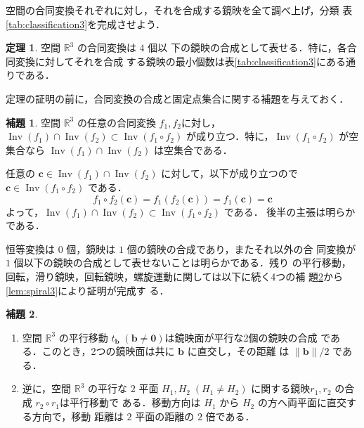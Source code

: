 \documentclass[11pt, uplatex, dvipdfmx, titlepage]{jsarticle}
\makeatletter
\DeclareMathOperator{\Inv}{Inv}
\renewenvironment{proof}[1][\proofname]{\par
  \pushQED{\qed}%
  \normalfont \topsep6\p@\@plus6\p@\relax
  \trivlist
  \item[\hskip\labelsep
         \bfseries
    {#1}]\ignorespaces
}{%
  \popQED\endtrivlist\@endpefalse
}
\theoremstyle{definition}
\newtheorem{theorem}{定理}[section]
\newtheorem{lemma}{補題}[section]
\renewcommand{\proofname}{\textbf{証明}}
\makeatother
\begin{document}
空間の合同変換それぞれに対し，それを合成する鏡映を全て調べ上げ，分類
表\ref{tab:classification3}を完成させよう．

\begin{theorem}\label{thm:generate3}
  空間 $\mathbb{R}^3$ の合同変換は $4$ 個以
  下の鏡映の合成として表せる．特に，各合同変換に対してそれを合成
  する鏡映の最小個数は表\ref{tab:classification3}にある通りである．
\end{theorem}

定理の証明の前に，合同変換の合成と固定点集合に関する補題を与えておく．

\begin{lemma}\label{lem:inv-comp3}
  空間 $\mathbb{R}^3$ の任意の合同変換 $f_1,
  f_2$に対し，$ \Inv(f_1) \cap \Inv(f_2) \subset \Inv(f_1 \circ f_2)$
  が成り立つ．特に，$\Inv(f_1 \circ f_2)$ が空集合なら $\Inv(f_1) \cap
  \Inv(f_2)$ は空集合である．
\end{lemma}

\begin{proof}
  任意の $\bm{c} \in \Inv(f_1) \cap \Inv(f_2)$ に対して，以下が成り立つので $\bm{c} \in \Inv(f_1 \circ f_2)$ である．
  \[
    f_1 \circ f_2(\bm{c}) = f_1\left( f_2(\bm{c})\right) = f_1(\bm{c}) = \bm{c}
  \]
  よって，$\Inv(f_1) \cap \Inv(f_2) \subset \Inv(f_1 \circ f_2)$ である．
  後半の主張は明らかである．
\end{proof}


\begin{proof}[定理\ref{thm:generate3}の証明]
  恒等変換は $0$ 個，鏡映は $1$ 個の鏡映の合成であり，またそれ以外の合
  同変換が $1$ 個以下の鏡映の合成として表せないことは明らかである．残り
  の平行移動，回転，滑り鏡映，回転鏡映，螺旋運動に関しては以下に続く4つの補
  題\ref{lem:translation3}から\ref{lem:spiral3}により証明が完成す
  る．
\end{proof}


\begin{lemma}\label{lem:translation3}
  \begin{enumerate}[(1)]
  \item 空間 $\mathbb{R}^3$ の平行移動
    $t_{\bm{b}} \; (\bm{b} \neq \bm{0})$は鏡映面が平行な2個の鏡映の合成
    である．このとき，2つの鏡映面は共に $\bm{b}$ に直交し，その距離
    は $\|\bm{b}\|/2$ である．

\item 逆に，空間 $\mathbb{R}^3$ の平行な $2$ 平面 $H_1, H_2 \; (H_1
  \neq H_2)$ に関する鏡映$r_1, r_2$ の合成 $r_2 \circ r_1$は平行移動で
  ある．移動方向は $H_1$ から $H_2$ の方へ両平面に直交する方向で，移動
  距離は $2$ 平面の距離の $2$ 倍である．
  \end{enumerate}
\end{lemma}
\end{document}
